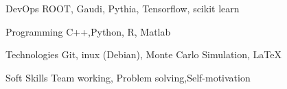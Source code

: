 

\begin{cvskills}

  \cvskill
    {DevOps} %
    {ROOT, Gaudi, Pythia, Tensorflow, scikit learn} %


  \cvskill
    {Programming} %
    {C++,Python, R, Matlab} %

  \cvskill
    {Technologies} %
    {Git, inux (Debian), Monte Carlo Simulation, \LaTeX} %

      \cvskill
    {Soft Skills} %
    {Team working, Problem solving,Self-motivation} %


\end{cvskills}
